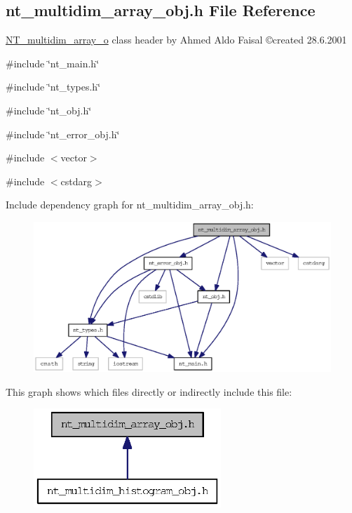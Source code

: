 \subsection{nt\_\-multidim\_\-array\_\-obj.h File Reference}
\label{nt__multidim__array__obj_8h}



\begin{DoxyItemize}
\item \hyperlink{class_n_t__multidim__array__o}{NT\_\-multidim\_\-array\_\-o} class header by Ahmed Aldo Faisal \copyright created 28.6.2001 
\end{DoxyItemize} 


{\ttfamily \#include \char`\"{}nt\_\-main.h\char`\"{}}\par
{\ttfamily \#include \char`\"{}nt\_\-types.h\char`\"{}}\par
{\ttfamily \#include \char`\"{}nt\_\-obj.h\char`\"{}}\par
{\ttfamily \#include \char`\"{}nt\_\-error\_\-obj.h\char`\"{}}\par
{\ttfamily \#include $<$vector$>$}\par
{\ttfamily \#include $<$cstdarg$>$}\par
Include dependency graph for nt\_\-multidim\_\-array\_\-obj.h:
\nopagebreak
\begin{figure}[H]
\begin{center}
\leavevmode
\includegraphics[width=400pt]{nt__multidim__array__obj_8h__incl}
\end{center}
\end{figure}
This graph shows which files directly or indirectly include this file:
\nopagebreak
\begin{figure}[H]
\begin{center}
\leavevmode
\includegraphics[width=200pt]{nt__multidim__array__obj_8h__dep__incl}
\end{center}
\end{figure}
